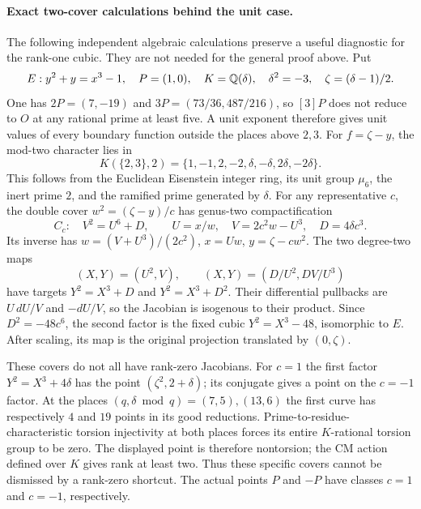\paragraph{Exact two-cover calculations behind the unit case.}
The following independent algebraic calculations preserve a useful
diagnostic for the rank-one cubic. They are not needed for the
general proof above. Put
\[
 E:y^2+y=x^3-1,\quad P=(1,0),\quad
 K=\mathbb Q(\delta),\quad\delta^2=-3,\quad\zeta=(\delta-1)/2.
\]
One has
$2P=(7,-19)$ and
$3P=(73/36,487/216)$, so $[3]P$ does not reduce to
$O$ at any rational prime at least five. A unit
exponent therefore gives unit values of every
boundary function outside the places above $2,3$.
For $f=\zeta-y$, the mod-two character lies in
\[
 K(\{2,3\},2)=
 \{1,-1,2,-2,\delta,-\delta,2\delta,-2\delta\}.
 \tag{A65.15}
\]
This follows from the Euclidean Eisenstein integer
ring, its unit group $\mu_6$, the inert prime $2$,
and the ramified prime generated by $\delta$.
For any representative $c$, the double cover
$w^2=(\zeta-y)/c$ has genus-two compactification
\[
 C_c:\quad V^2=U^6+D,\qquad
 U=x/w,\quad V=2c^2w-U^3,\quad D=4\delta c^3.
 \tag{A65.16}
\]
Its inverse has
$w=(V+U^3)/(2c^2)$, $x=Uw$, $y=\zeta-cw^2$.
The two degree-two maps
\[
 (X,Y)=(U^2,V),\qquad
 (X,Y)=(D/U^2,DV/U^3)
 \tag{A65.17}
\]
have targets $Y^2=X^3+D$ and $Y^2=X^3+D^2$.
Their differential pullbacks are $U\,dU/V$ and
$-dU/V$, so the Jacobian is isogenous to their
product. Since $D^2=-48c^6$, the second factor
is the fixed cubic $Y^2=X^3-48$, isomorphic
to $E$. After scaling, its map is the original
projection translated by $(0,\zeta)$.

These covers do not all have rank-zero Jacobians.
For $c=1$ the first factor $Y^2=X^3+4\delta$
has the point $(\zeta^2,2+\delta)$; its conjugate
gives a point on the $c=-1$ factor. At the places
$(q,\delta\bmod q)=(7,5),(13,6)$ the first curve
has respectively $4$ and $19$ points in its good
reductions. Prime-to-residue-characteristic torsion
injectivity at both places forces its entire
$K$-rational torsion group to be zero. The displayed
point is therefore nontorsion; the CM action
defined over $K$ gives rank at least two.
Thus these specific covers cannot be dismissed
by a rank-zero shortcut. The actual points
$P$ and $-P$ have classes $c=1$ and $c=-1$,
respectively.

